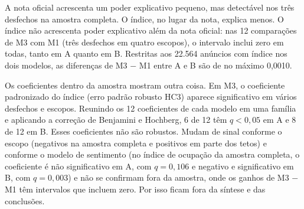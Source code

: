 \begin{table}[htb]
\centering
\caption{Ganho de $R^2$ fora da amostra: média entre dobras e intervalo entre dobras (versão resumida; as 12 comparações estão no Apêndice D).}
\scriptsize
{}
\label{tab:ganho}
\end{table}

A nota oficial acrescenta um poder explicativo pequeno, mas detectável nos três desfechos na amostra completa. O índice, no lugar da nota, explica menos. O índice não acrescenta poder explicativo além da nota oficial: nas 12 comparações de M3 com M1 (três desfechos em quatro escopos), o intervalo inclui zero em todas, tanto em A quanto em B. Restritas aos 22.564 anúncios com índice nos dois modelos, as diferenças de M3 $-$ M1 entre A e B são de no máximo 0,0010.

Os coeficientes dentro da amostra mostram outra coisa. Em M3, o coeficiente padronizado do índice (erro padrão robusto HC3) aparece significativo em vários desfechos e escopos. Reunindo os 12 coeficientes de cada modelo em uma família e aplicando a correção de Benjamini e Hochberg, 6 de 12 têm $q < 0{,}05$ em A e 8 de 12 em B. Esses coeficientes não são robustos. Mudam de sinal conforme o escopo (negativos na amostra completa e positivos em parte dos tetos) e conforme o modelo de sentimento (no índice de ocupação da amostra completa, o coeficiente é não significativo em A, com $q = 0{,}106$ e negativo e significativo em B, com $q = 0{,}003$) e não se confirmam fora da amostra, onde os ganhos de M3 $-$ M1 têm intervalos que incluem zero. Por isso ficam fora da síntese e das conclusões.

